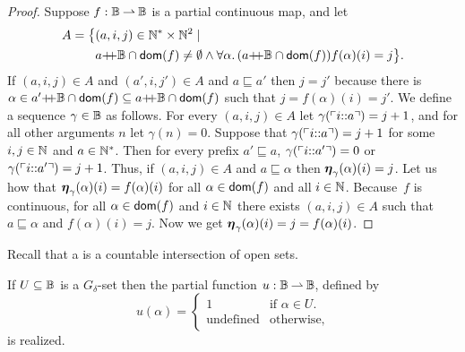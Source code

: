 \begin{proof}
  Suppose $f: \mathbb{B} \mathbin{\rightharpoonup} \mathbb{B}$ is a partial continuous map, and let
  \begin{align*}
     A = \big\{ & (a, i, j) \in \mathbb{N}^{*} \times \mathbb{N}^{2} \mid \\
       &a{{+}\!\!{+}}\mathbb{B} \cap \mathsf{dom}(f) \neq \emptyset \land
        \forall \alpha .\,{(a{{+}\!\!{+}}\mathbb{B} \cap \mathsf{dom}(f))}{
          f(\alpha)(i) = j
          }
        \big\}.
  \end{align*}
  If $(a, i, j) \in A$ and $(a', i, j') \in A$ and $a \sqsubseteq a'$
  then $j = j'$ because there is $\alpha \in a'{{+}\!\!{+}}\mathbb{B} \cap
  \mathsf{dom}(f) \subseteq a{{+}\!\!{+}}\mathbb{B} \cap \mathsf{dom}(f)$ such that $j =
  f(\alpha)(i) = j'$. We define a sequence $\gamma \in \mathbb{B}$ as
  follows. For every $(a, i, j) \in A$ let
  $\gamma(\ulcorner i {:}{:} a \urcorner) = j + 1$, and for all other
  arguments $n$ let $\gamma(n) = 0$. Suppose that
  $\gamma(\ulcorner i {:}{:} a \urcorner) = j + 1$ for some $i, j \in \mathbb{N}$
  and $a \in \mathbb{N}^{*}$. Then for every prefix $a' \sqsubseteq a$,
  $\gamma(\ulcorner i {:}{:} a' \urcorner) = 0$ or
  $\gamma(\ulcorner i {:}{:} a' \urcorner) = j + 1$. Thus, if $(a, i, j) \in
  A$ and $a \sqsubseteq \alpha$ then $\text{\boldmath{$\eta$}}_{\gamma}(\alpha)(i) = j$.
  Let us how that $\text{\boldmath{$\eta$}}_{\gamma}(\alpha)(i) = f(\alpha)(i)$ for all
  $\alpha \in \mathsf{dom}(f)$ and all $i \in \mathbb{N}$. Because~$f$ is continuous,
  for all $\alpha \in \mathsf{dom}(f)$ and $i \in \mathbb{N}$ there exists $(a, i, j)
  \in A$ such that $a \sqsubseteq \alpha$ and $f(\alpha)(i) = j$. Now
  we get
  $
    \text{\boldmath{$\eta$}}_{\gamma}(\alpha)(i)
    = j
    = f(\alpha)(i)
  $.
\end{proof}

%
Recall that a  is a countable intersection of open sets.

\begin{lemma}
  \label{th:G_delta_characteristic}%
  If $U \subseteq \mathbb{B}$ is a $G_\delta$-set then the partial
  function $u: \mathbb{B} \mathbin{\rightharpoonup} \mathbb{B}$, defined by
  \begin{equation*}
    u(\alpha) =
    \begin{cases}
      1 & \text{if $\alpha \in U$.}\\
      \text{undefined} & \text{otherwise,}
    \end{cases}
  \end{equation*}
  is realized.
\end{lemma}

